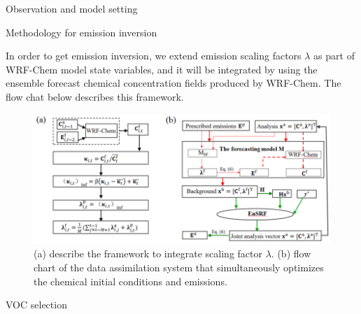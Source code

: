 \documentclass[final]{beamer}
\newlength{\colwidth}
\begin{document}
\begin{frame}[t]
\begin{columns}[t]
\begin{column}{\colwidth}
\begin{block}{Observation and model setting}
			\end{block}
			
			\begin{block}{Methodology for emission inversion}
				
                In order to get emission inversion, we extend emission scaling factors $\lambda$ as part of WRF-Chem model state variables, and it will be integrated by using the ensemble forecast chemical concentration fields produced by WRF-Chem. The flow chat below describes this framework.  
 
                \begin{figure}
                    \centerline{\includegraphics[width=30pc,angle=0,scale=2.5]{figure/Methodology.png}}
                    \caption{(a) describe the framework to integrate scaling factor $\lambda$. (b) flow chart of the data assimilation system that simultaneously optimizes the chemical initial
                    conditions and emissions.}\label{fig2}
                \end{figure}

				
			
				
			\end{block}
			
			\begin{block}{VOC selection}

				
    

\end{block}
\end{column}
\end{columns}
\end{frame}
\end{document}
